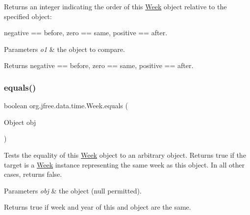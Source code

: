 Returns an integer indicating the order of this \mbox{\hyperlink{classorg_1_1jfree_1_1data_1_1time_1_1_week}{Week}} object relative to the specified object\+:

negative == before, zero == same, positive == after.


\begin{DoxyParams}{Parameters}
{\em o1} & the object to compare.\\
\hline
\end{DoxyParams}
\begin{DoxyReturn}{Returns}
negative == before, zero == same, positive == after. 
\end{DoxyReturn}
\mbox{\label{classorg_1_1jfree_1_1data_1_1time_1_1_week_a578ca4171ac54341c0590dbd544e8294}} 
\subsubsection{\texorpdfstring{equals()}{equals()}}
{\footnotesize\ttfamily boolean org.\+jfree.\+data.\+time.\+Week.\+equals (\begin{DoxyParamCaption}\item[{Object}]{obj }\end{DoxyParamCaption})}

Tests the equality of this \mbox{\hyperlink{classorg_1_1jfree_1_1data_1_1time_1_1_week}{Week}} object to an arbitrary object. Returns true if the target is a \mbox{\hyperlink{classorg_1_1jfree_1_1data_1_1time_1_1_week}{Week}} instance representing the same week as this object. In all other cases, returns false.


\begin{DoxyParams}{Parameters}
{\em obj} & the object ({\ttfamily null} permitted).\\
\hline
\end{DoxyParams}
\begin{DoxyReturn}{Returns}
{\ttfamily true} if week and year of this and object are the same. 
\end{DoxyReturn}
\mbox{\label{classorg_1_1jfree_1_1data_1_1time_1_1_week_a75fe3256e304fb99a5dc9c75c673b318}} 
